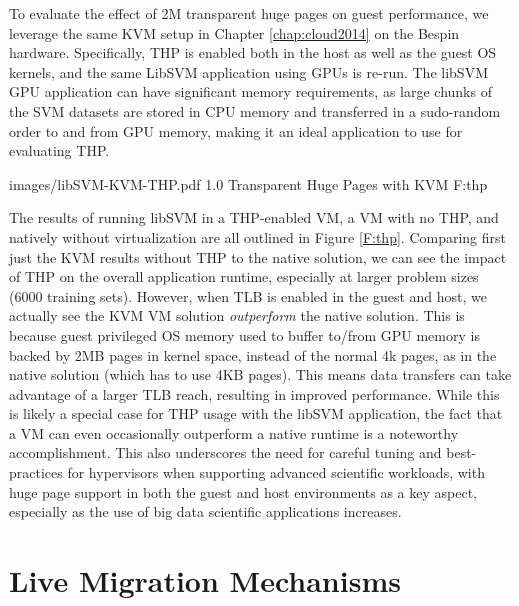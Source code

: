 To evaluate the effect of 2M transparent huge pages on guest performance, we leverage the same KVM setup in Chapter \ref{chap:cloud2014} on the Bespin hardware. Specifically, THP is enabled both in the host as well as the guest OS kernels, and the same LibSVM application using GPUs is re-run. The libSVM GPU application can have significant memory requirements, as large chunks of the SVM datasets are stored in CPU memory and transferred in a sudo-random order to and from GPU memory, making it an ideal application to use for evaluating THP.



  {images/libSVM-KVM-THP.pdf}
  {1.0}
  {Transparent Huge Pages with KVM}
  {F:thp}


The results of running libSVM in a THP-enabled VM, a VM with no THP, and natively without virtualization are all outlined in Figure \ref{F:thp}.  Comparing first just the KVM results without THP to the native solution, we can see the impact of THP on the overall application runtime, especially at larger problem sizes (6000 training sets). However, when TLB is enabled in the guest and host, we actually see the KVM VM solution \emph{outperform} the native solution. This is because guest privileged OS memory used to buffer to/from GPU memory is backed by 2MB pages in kernel space, instead of the normal 4k pages, as in the native solution (which has to use 4KB pages). This means data transfers can take advantage of a larger TLB reach, resulting in improved performance.  While this is likely a special case for THP usage with the libSVM application, the fact that a VM can even occasionally outperform a native runtime is a noteworthy accomplishment. This also underscores the need for careful tuning and best-practices for hypervisors when supporting advanced scientific workloads, with huge page support in both the guest and host environments as a key aspect, especially as the use of big data scientific applications increases.  

\section{Live Migration Mechanisms}


